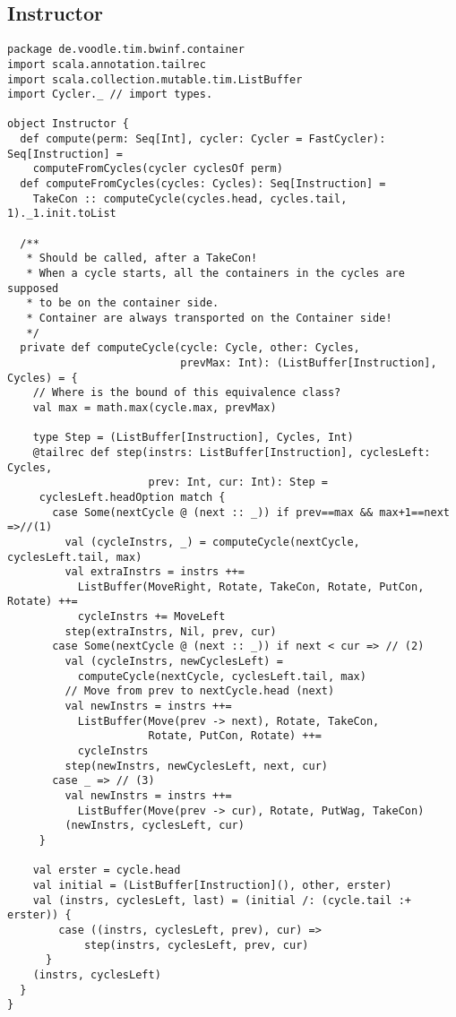 \clearpage\subsection{Instructor}
\begin{lstlisting}
package de.voodle.tim.bwinf.container
import scala.annotation.tailrec
import scala.collection.mutable.tim.ListBuffer
import Cycler._ // import types.

object Instructor {
  def compute(perm: Seq[Int], cycler: Cycler = FastCycler): Seq[Instruction] =
    computeFromCycles(cycler cyclesOf perm)
  def computeFromCycles(cycles: Cycles): Seq[Instruction] =
    TakeCon :: computeCycle(cycles.head, cycles.tail, 1)._1.init.toList

  /**
   * Should be called, after a TakeCon!
   * When a cycle starts, all the containers in the cycles are supposed
   * to be on the container side.
   * Container are always transported on the Container side!
   */
  private def computeCycle(cycle: Cycle, other: Cycles,
                           prevMax: Int): (ListBuffer[Instruction], Cycles) = {
    // Where is the bound of this equivalence class?
    val max = math.max(cycle.max, prevMax)

    type Step = (ListBuffer[Instruction], Cycles, Int)
    @tailrec def step(instrs: ListBuffer[Instruction], cyclesLeft: Cycles,
                      prev: Int, cur: Int): Step =
     cyclesLeft.headOption match {
       case Some(nextCycle @ (next :: _)) if prev==max && max+1==next =>//(1)
         val (cycleInstrs, _) = computeCycle(nextCycle, cyclesLeft.tail, max)
         val extraInstrs = instrs ++=
           ListBuffer(MoveRight, Rotate, TakeCon, Rotate, PutCon, Rotate) ++=
           cycleInstrs += MoveLeft
         step(extraInstrs, Nil, prev, cur)
       case Some(nextCycle @ (next :: _)) if next < cur => // (2)
         val (cycleInstrs, newCyclesLeft) =
           computeCycle(nextCycle, cyclesLeft.tail, max)
         // Move from prev to nextCycle.head (next)
         val newInstrs = instrs ++=
           ListBuffer(Move(prev -> next), Rotate, TakeCon,
                      Rotate, PutCon, Rotate) ++=
           cycleInstrs
         step(newInstrs, newCyclesLeft, next, cur)
       case _ => // (3)
         val newInstrs = instrs ++=
           ListBuffer(Move(prev -> cur), Rotate, PutWag, TakeCon)
         (newInstrs, cyclesLeft, cur)
     }

    val erster = cycle.head
    val initial = (ListBuffer[Instruction](), other, erster)
    val (instrs, cyclesLeft, last) = (initial /: (cycle.tail :+ erster)) {
        case ((instrs, cyclesLeft, prev), cur) =>
            step(instrs, cyclesLeft, prev, cur)
      }
    (instrs, cyclesLeft)
  }
}
\end{lstlisting}

